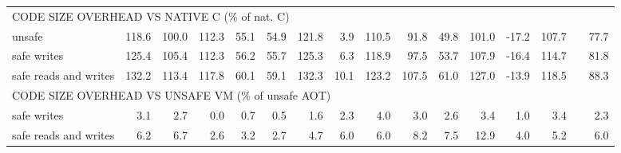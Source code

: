 \begin{tabular}{lrrrrrrrrrrrrrrr}
\multicolumn{10}{l}{CODE SIZE OVERHEAD VS NATIVE C (\% of nat. C)} \\
unsafe                              &      118.6 &      100.0 &      112.3 &       55.1 &       54.9 &      121.8 &        3.9 &      110.5 &       91.8 &       49.8 &      101.0 &      -17.2 &      107.7 &                   &      77.7 \\
safe writes                         &      125.4 &      105.4 &      112.3 &       56.2 &       55.7 &      125.3 &        6.3 &      118.9 &       97.5 &       53.7 &      107.9 &      -16.4 &      114.7 &                   &      81.8 \\
safe reads and writes               &      132.2 &      113.4 &      117.8 &       60.1 &       59.1 &      132.3 &       10.1 &      123.2 &      107.5 &       61.0 &      127.0 &      -13.9 &      118.5 &                   &      88.3 \\
\multicolumn{10}{l}{CODE SIZE OVERHEAD VS UNSAFE VM (\% of unsafe AOT)} \\
safe writes                         &        3.1 &        2.7 &        0.0 &        0.7 &        0.5 &        1.6 &        2.3 &        4.0 &        3.0 &        2.6 &        3.4 &        1.0 &        3.4 &                   &       2.3 \\
safe reads and writes               &        6.2 &        6.7 &        2.6 &        3.2 &        2.7 &        4.7 &        6.0 &        6.0 &        8.2 &        7.5 &       12.9 &        4.0 &        5.2 &                   &       6.0 \\
\bottomrule
\end{tabular}  
